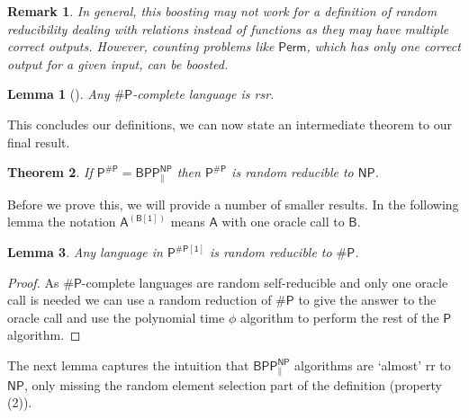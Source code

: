 \documentclass{article}
\newtheorem{theorem}{Theorem}
\newtheorem{lemma}[theorem]{Lemma}
\newtheorem*{remark*}{Remark}
\begin{document}
\begin{remark*}
    In general, this boosting may not work for a definition of random reducibility dealing with relations instead of functions as they may have multiple correct outputs. However, counting problems like $\mathsf{Perm}$, which has only one correct output for a given input, can be boosted.
\end{remark*}


\begin{lemma}[\cite{feigenbaum1990random}]\label{lma: perm is rsr}
    Any $\mathsf{\#P}$-complete language is rsr.
\end{lemma}

This concludes our definitions, we can now state an intermediate theorem to our final result.

\begin{theorem}\label{thm: BPP is rr to NP}
    If $\mathsf{P^{\# P}= BPP_{\parallel}^{NP}}$ then $\mathsf{P^{\# P}}$ is random reducible to $\mathsf{NP}$.
\end{theorem}

Before we prove this, we will provide a number of smaller results. In the following lemma the notation $\mathsf{A^{(B[1])}}$ means $\mathsf{A}$ with one oracle call to $\mathsf{B}$.

\begin{lemma}\label{lma: P to 1 sharp P is rr to 1 sharp P}
    Any language in $\mathsf{P^{\# P[1]}}$ is random reducible to $\mathsf{\# P}$.
\end{lemma}
\begin{proof}
    As $\mathsf{\# P}$-complete languages are random self-reducible and only one oracle call is needed we can use a random reduction of $\mathsf{\# P}$ to give the answer to the oracle call and use the polynomial time $\phi$ algorithm to perform the rest of the $\mathsf{P}$ algorithm.
\end{proof}

The next lemma captures the intuition that $\mathsf{BPP^{NP}_{\parallel}}$ algorithms are `almost' rr to $\mathsf{NP}$, only missing the random element selection part of the definition (property (2)).
\end{document}
